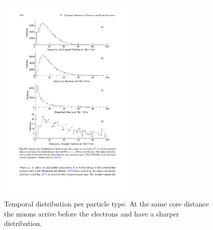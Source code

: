 \begin{figure}
    \centering
    \includegraphics[width=0.6\textwidth]
                    {plots/cosmic-rays/temporal_per_particle}
    \caption{Temporal distribution per particle type. At the same core distance the muons arrive before the electrons and have a sharper distribution. \cite{grieder2010eas}}
    \label{fig:temporal_per_particle}
\end{figure}

%
%
%
%
